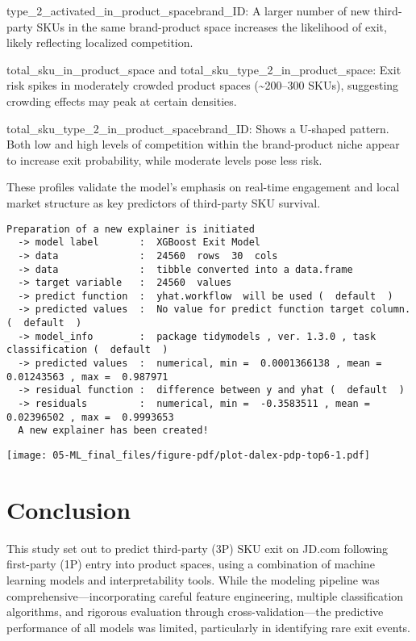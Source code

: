 \documentclass[
  letterpaper,
  DIV=11,
  numbers=noendperiod]{scrartcl}
\begin{document}
type\_2\_activated\_in\_product\_spacebrand\_ID: A larger number of new
third-party SKUs in the same brand-product space increases the
likelihood of exit, likely reflecting localized competition.

total\_sku\_in\_product\_space and
total\_sku\_type\_2\_in\_product\_space: Exit risk spikes in moderately
crowded product spaces (\textasciitilde200--300 SKUs), suggesting
crowding effects may peak at certain densities.

total\_sku\_type\_2\_in\_product\_spacebrand\_ID: Shows a U-shaped
pattern. Both low and high levels of competition within the
brand-product niche appear to increase exit probability, while moderate
levels pose less risk.

These profiles validate the model's emphasis on real-time engagement and
local market structure as key predictors of third-party SKU survival.

\begin{verbatim}
Preparation of a new explainer is initiated
  -> model label       :  XGBoost Exit Model 
  -> data              :  24560  rows  30  cols 
  -> data              :  tibble converted into a data.frame 
  -> target variable   :  24560  values 
  -> predict function  :  yhat.workflow  will be used (  default  )
  -> predicted values  :  No value for predict function target column. (  default  )
  -> model_info        :  package tidymodels , ver. 1.3.0 , task classification (  default  ) 
  -> predicted values  :  numerical, min =  0.0001366138 , mean =  0.01243563 , max =  0.987971  
  -> residual function :  difference between y and yhat (  default  )
  -> residuals         :  numerical, min =  -0.3583511 , mean =  0.02396502 , max =  0.9993653  
  A new explainer has been created!  
\end{verbatim}

\texttt{[image: 05-ML\_final\_files/figure-pdf/plot-dalex-pdp-top6-1.pdf]}

\section{Conclusion}\label{conclusion}

This study set out to predict third-party (3P) SKU exit on JD.com
following first-party (1P) entry into product spaces, using a
combination of machine learning models and interpretability tools. While
the modeling pipeline was comprehensive---incorporating careful feature
engineering, multiple classification algorithms, and rigorous evaluation
through cross-validation---the predictive performance of all models was
limited, particularly in identifying rare exit events.
\end{document}
